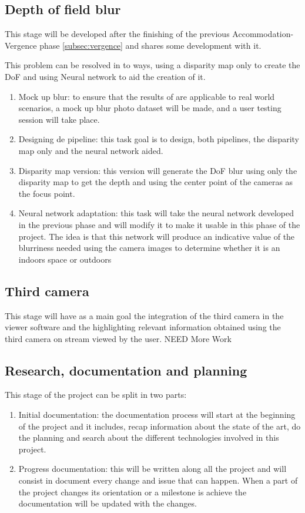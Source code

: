 \documentclass[10pt,a4paper,twocolumn,twoside]{article}
\begin{document}
\subsection{Depth of field blur}
This stage will be developed after the finishing of the previous Accommodation-Vergence phase \ref{subsec:vergence} and shares some development with it. 

This problem can be resolved in to ways, using a disparity map only to create the DoF and using Neural network to aid the creation of it.

\begin{enumerate}
	\item Mock up blur: to ensure that the results of \cite{ifftConfortDoF} are applicable to real world scenarios, a mock up blur photo dataset will be made, and a user testing session will take place.
	
	\item Designing de pipeline: this task goal is to design, both pipelines, the disparity map only and the neural network aided.
	
	\item Disparity map version: this version will generate the DoF blur using only the disparity map to get the depth and using the center point of the cameras as the focus point.
	
	\item Neural network adaptation: this task will take the neural network developed in the previous phase and will modify it to make it usable in this phase of the project. The idea is that this network will produce an indicative value of the blurriness needed using the camera images to determine whether it is an indoors space or outdoors 
\end{enumerate}

\subsection{Third camera}
This stage will have as a main goal the integration of the third camera in the viewer software and the highlighting relevant information obtained using the third camera on stream viewed by the user. NEED More Work

\subsection{Research, documentation and planning}
This stage of the project can be split in two parts:
\begin{enumerate}
	\item Initial documentation: the documentation process will start at the beginning of the project and it includes, recap information about the state of the art, do the planning and search about the different technologies involved in this project. 
	
	\item Progress documentation: this will be written along all the project and will consist in document every change and issue that can happen. When a part of the project changes its orientation or a milestone is achieve the documentation will be updated with the changes. 
\end{enumerate}
\end{document}
